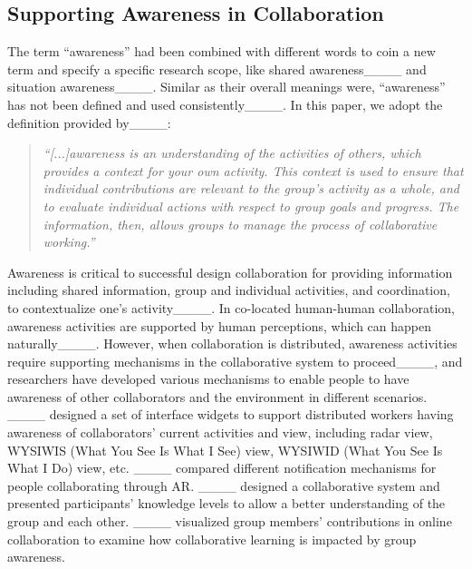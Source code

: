 \subsection{Supporting Awareness in Collaboration}
The term ``awareness'' had been combined with different words to coin a new term and specify a specific research scope, like shared awareness____ and situation awareness____. Similar as their overall meanings were, ``awareness'' has not been defined and used consistently____. In this paper, we adopt the definition provided by____:

\begin{quote}
    \textit{``[...]awareness is an understanding of the activities of others, which provides a context for your own activity. This context is used to ensure that individual contributions are relevant to the group's activity as a whole, and to evaluate individual actions with respect to group goals and progress. The information, then, allows groups to manage the process of collaborative working.''}
\end{quote}

Awareness is critical to successful design collaboration for providing information including shared information, group and individual activities, and coordination, to contextualize one's activity____. In co-located human-human collaboration, awareness activities are supported by human perceptions, which can happen naturally____. However, when collaboration is distributed, awareness activities require supporting mechanisms in the collaborative system to proceed____, and researchers have developed various mechanisms to enable people to have awareness of other collaborators and the environment in different scenarios. ____ designed a set of interface widgets to support distributed workers having awareness of collaborators' current activities and view, including radar view, WYSIWIS (What You See Is What I See) view, WYSIWID (What You See Is What I Do) view, etc. ____ compared different notification mechanisms for people collaborating through AR. ____ designed a collaborative system and presented participants' knowledge levels to allow a better understanding of the group and each other. ____ visualized group members' contributions in online collaboration to examine how collaborative learning is impacted by group awareness.

